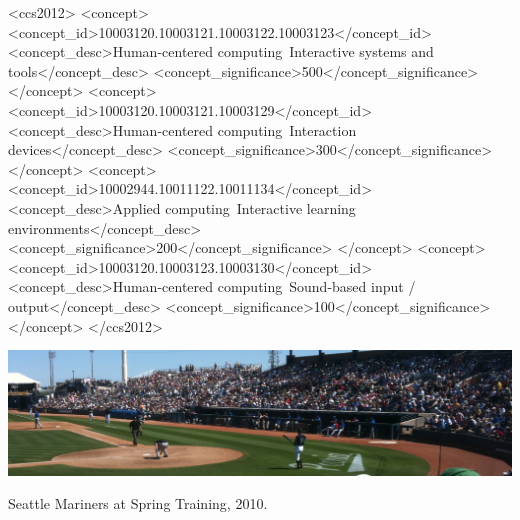 \documentclass[sigconf,authordraft]{acmart}
\begin{document}
\begin{CCSXML}
<ccs2012>
 <concept>
  <concept_id>10003120.10003121.10003122.10003123</concept_id>
  <concept_desc>Human-centered computing~Interactive systems and tools</concept_desc>
  <concept_significance>500</concept_significance>
 </concept>
 <concept>
  <concept_id>10003120.10003121.10003129</concept_id>
  <concept_desc>Human-centered computing~Interaction devices</concept_desc>
  <concept_significance>300</concept_significance>
 </concept>
 <concept>
  <concept_id>10002944.10011122.10011134</concept_id>
  <concept_desc>Applied computing~Interactive learning environments</concept_desc>
  <concept_significance>200</concept_significance>
 </concept>
 <concept>
  <concept_id>10003120.10003123.10003130</concept_id>
  <concept_desc>Human-centered computing~Sound-based input / output</concept_desc>
  <concept_significance>100</concept_significance>
 </concept>
</ccs2012>
\end{CCSXML}



\begin{teaserfigure}
  \includegraphics[width=\textwidth]{sampleteaser}
  \caption{Seattle Mariners at Spring Training, 2010.}
  \label{fig:teaser}
\end{teaserfigure}

\end{document}
